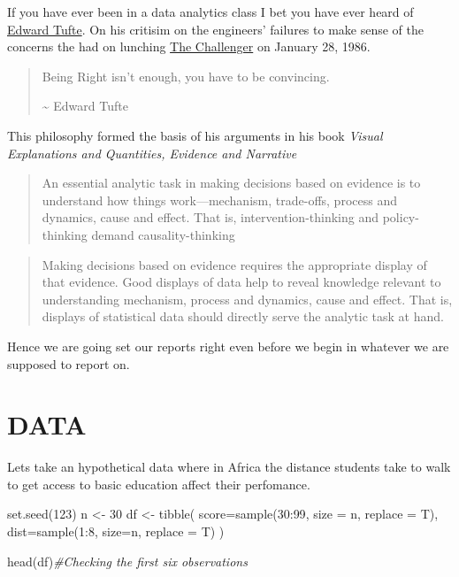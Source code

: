 \documentclass[
]{book}
\newenvironment{Shaded}{\begin{snugshade}}{\end{snugshade}}
\newcommand{\AttributeTok}[1]{\textcolor[rgb]{0.77,0.63,0.00}{#1}}
\newcommand{\CommentTok}[1]{\textcolor[rgb]{0.56,0.35,0.01}{\textit{#1}}}
\newcommand{\DecValTok}[1]{\textcolor[rgb]{0.00,0.00,0.81}{#1}}
\newcommand{\FunctionTok}[1]{\textcolor[rgb]{0.00,0.00,0.00}{#1}}
\newcommand{\NormalTok}[1]{#1}
\newcommand{\OtherTok}[1]{\textcolor[rgb]{0.56,0.35,0.01}{#1}}
\newcommand{\SpecialCharTok}[1]{\textcolor[rgb]{0.00,0.00,0.00}{#1}}
\begin{document}
If you have ever been in a data analytics class I bet you have ever heard of \href{https://www.tufte.com}{Edward Tufte}. On his critisim on the engineers' failures to make sense of the concerns the had on lunching \href{https://www.nasa/challenger/.com}{The Challenger} on January 28, 1986.

\begin{quote}
Being Right isn't enough, you have to be convincing.

\textasciitilde{} Edward Tufte
\end{quote}

This philosophy formed the basis of his arguments in his book \emph{Visual Explanations and Quantities, Evidence and Narrative}

\begin{quote}
An essential analytic task in making decisions based on evidence
is to understand how things work---mechanism, trade-offs, process
and dynamics, cause and effect. That is, intervention-thinking and
policy-thinking demand causality-thinking
\end{quote}

\begin{quote}
Making decisions based on evidence requires the appropriate display
of that evidence. Good displays of data help to reveal knowledge
relevant to understanding mechanism, process and dynamics, cause
and effect. That is, displays of statistical data should directly serve the
analytic task at hand.
\end{quote}

Hence we are going set our reports right even before we begin in whatever we are supposed to report on.

\hypertarget{data}{%
\section{DATA}\label{data}}

Lets take an hypothetical data where in Africa the distance students take to walk to get access to basic education affect their perfomance.

\begin{Shaded}
\begin{Highlighting}[]
\FunctionTok{set.seed}\NormalTok{(}\DecValTok{123}\NormalTok{)}
\NormalTok{n }\OtherTok{\textless{}{-}} \DecValTok{30}
\NormalTok{df }\OtherTok{\textless{}{-}} \FunctionTok{tibble}\NormalTok{(}
  \AttributeTok{score=}\FunctionTok{sample}\NormalTok{(}\DecValTok{30}\SpecialCharTok{:}\DecValTok{99}\NormalTok{, }\AttributeTok{size =}\NormalTok{ n, }\AttributeTok{replace =}\NormalTok{ T),}
  \AttributeTok{dist=}\FunctionTok{sample}\NormalTok{(}\DecValTok{1}\SpecialCharTok{:}\DecValTok{8}\NormalTok{, }\AttributeTok{size=}\NormalTok{n, }\AttributeTok{replace =}\NormalTok{ T)}
\NormalTok{)}

\FunctionTok{head}\NormalTok{(df)}\CommentTok{\#Checking the first six observations}
\end{Highlighting}
\end{Shaded}
\end{document}
